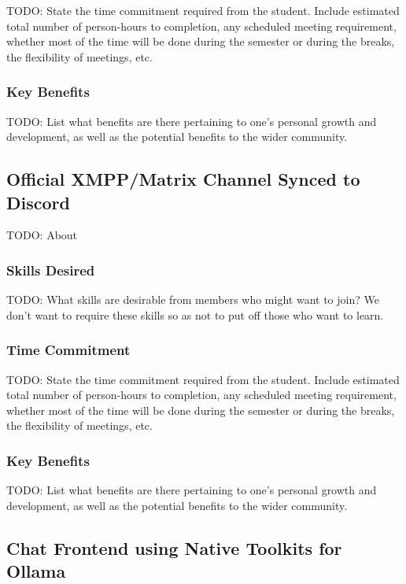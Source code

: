 \documentclass[11pt,fleqn]{article}
\begin{document}
TODO: State the time commitment required from the student.  Include estimated total number of person-hours to completion, any scheduled meeting requirement, whether most of the time will be done during the semester or during the breaks, the flexibility of meetings, etc.

\subsubsection*{Key Benefits}

TODO: List what benefits are there pertaining to one's personal growth and development, as well as the potential benefits to the wider community.

\subsection{Official XMPP/Matrix Channel Synced to Discord}

TODO: About

\subsubsection*{Skills Desired}

TODO: What skills are desirable from members who might want to join?  We don't want to require these skills so as not to put off those who want to learn.

\subsubsection*{Time Commitment}

TODO: State the time commitment required from the student.  Include estimated total number of person-hours to completion, any scheduled meeting requirement, whether most of the time will be done during the semester or during the breaks, the flexibility of meetings, etc.

\subsubsection*{Key Benefits}

TODO: List what benefits are there pertaining to one's personal growth and development, as well as the potential benefits to the wider community.

\subsection{Chat Frontend using Native Toolkits for Ollama}
\end{document}
